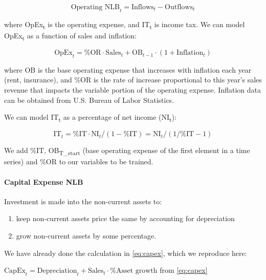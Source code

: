 \documentclass[12pt,a4paper]{article}
\begin{document}
\begin{equation}\label{eq:operating_nlb}
\text{Operating NLB}_t = \text{Inflows}_t - \text{Outflows}_t
\end{equation}

where OpEx\textsubscript{t} is the operating expense, and
IT\textsubscript{t} is income tax. We can model OpEx\textsubscript{t} as
a function of sales and inflation:

\begin{equation}\label{eq:opex}
\text{OpEx}_t = \text{\%OR} \cdot \text{Sales}_t + \text{OB}_{t-1} \cdot (1 + \text{Inflation}_t)
\end{equation}

where OB is the base operating expense that increases with inflation
each year (rent, insurance), and \%OR is the rate of increase
proportional to this year's sales revenue that impacts the variable
portion of the operating expense. Inflation data can be obtained from
U.S. Bureau of Labor Statistics.

We can model IT\textsubscript{t} as a percentage of net income
(NI\textsubscript{t}):

\begin{equation}\label{eq:income_tax}
\text{IT}_t = \text{\%IT} \cdot \text{NI}_t / (1 - \text{\%IT}) = \text{NI}_t / (1/\text{\%IT} - 1)
\end{equation}

We add \%IT, OB\textsubscript{T\_start} (base operating expense of the
first element in a time series) and \%OR to our variables to be trained.

\paragraph{Capital Expense NLB}

Investment is made into the non-current assets to:

\begin{enumerate}
\def\labelenumi{\alph{enumi})}
\item
  keep non-current assets price the same by accounting for depreciation
\item
  grow non-current assets by some percentage.
\end{enumerate}

We have already done the calculation in \eqref{eq:capex}, which we reproduce
here:

$\text{CapEx}_t = \text{Depreciation}_t + \text{Sales}_t \cdot \text{\%Asset growth}$ from \eqref{eq:capex}
\end{document}
